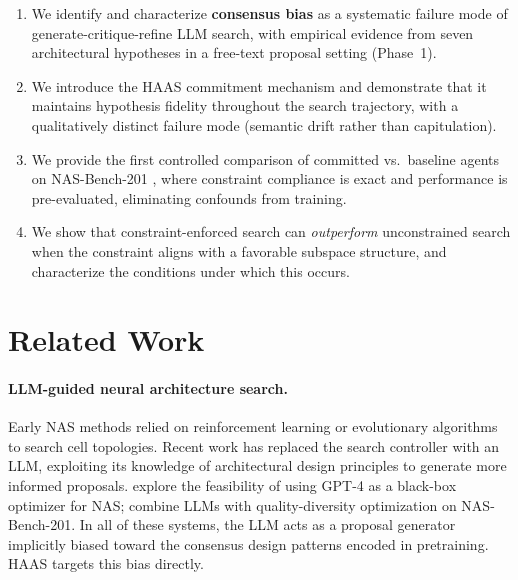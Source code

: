 \documentclass[10pt]{article}
\newcommand{\haas}{\textsc{HAAS}}
\newcommand{\nasbench}{NAS-Bench-201}
\begin{document}
\begin{enumerate}
  \item We identify and characterize \textbf{consensus bias} as a systematic
    failure mode of generate-critique-refine LLM search, with empirical evidence
    from seven architectural hypotheses in a free-text proposal setting (Phase~1).

  \item We introduce the \haas{} commitment mechanism and demonstrate that it
    maintains hypothesis fidelity throughout the search trajectory, with a
    qualitatively distinct failure mode (semantic drift rather than capitulation).

  \item We provide the first controlled comparison of committed vs.\ baseline
    agents on \nasbench{} \citep{dong2020nasbench201}, where constraint compliance
    is exact and performance is pre-evaluated, eliminating confounds from training.

  \item We show that constraint-enforced search can \emph{outperform}
    unconstrained search when the constraint aligns with a favorable subspace
    structure, and characterize the conditions under which this occurs.
\end{enumerate}

\section{Related Work}
\label{sec:related}

\paragraph{LLM-guided neural architecture search.}
Early NAS methods relied on reinforcement learning \citep{zoph2017neural} or
evolutionary algorithms \citep{real2019regularized} to search cell topologies.
Recent work has replaced the search controller with an LLM, exploiting its
knowledge of architectural design principles to generate more informed proposals.
\citet{zheng2023can} explore the feasibility of using GPT-4 as a black-box
optimizer for NAS; \citet{nasir2024llmatic} combine LLMs with quality-diversity
optimization on \nasbench{}. In all of these systems, the LLM acts as a proposal
generator implicitly biased toward the consensus design patterns encoded in
pretraining. \haas{} targets this bias directly.
\end{document}
